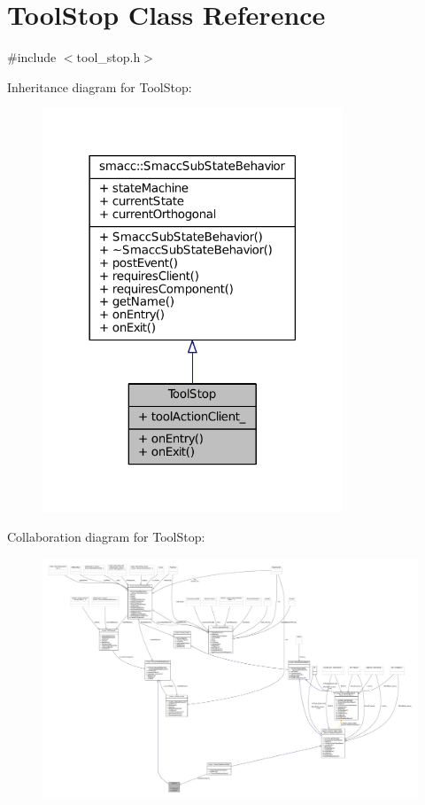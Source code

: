 \hypertarget{classToolStop}{}\section{Tool\+Stop Class Reference}
\label{classToolStop}


{\ttfamily \#include $<$tool\+\_\+stop.\+h$>$}



Inheritance diagram for Tool\+Stop\+:
\nopagebreak
\begin{figure}[H]
\begin{center}
\leavevmode
\includegraphics[width=254pt]{classToolStop__inherit__graph}
\end{center}
\end{figure}


Collaboration diagram for Tool\+Stop\+:
\nopagebreak
\begin{figure}[H]
\begin{center}
\leavevmode
\includegraphics[width=350pt]{classToolStop__coll__graph}
\end{center}
\end{figure}
